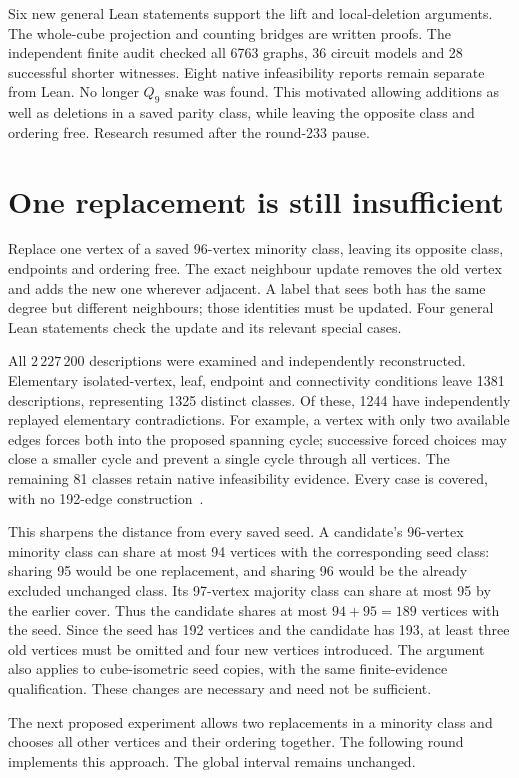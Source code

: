 \documentclass[11pt,a4paper]{article}
\begin{document}
Six new general Lean statements support the lift and local-deletion
arguments. The whole-cube projection and counting bridges are written
proofs. The independent finite audit checked all 6763 graphs, 36 circuit
models and 28 successful shorter witnesses. Eight native infeasibility
reports remain separate from Lean. No longer $Q_9$ snake was found.
This motivated allowing additions as well as deletions in a saved parity
class, while leaving the opposite class and ordering free. Research
resumed after the round-233 pause.

\section{One replacement is still insufficient}
Replace one vertex of a saved 96-vertex minority class, leaving its
opposite class, endpoints and ordering free. The exact neighbour update
removes the old vertex and adds the new one wherever adjacent. A label
that sees both has the same degree but different neighbours; those
identities must be updated. Four general Lean statements check the
update and its relevant special cases.

All $2\,227\,200$ descriptions were examined and independently
reconstructed. Elementary isolated-vertex, leaf, endpoint and connectivity
conditions leave 1381 descriptions, representing 1325 distinct classes.
Of these, 1244 have independently replayed elementary contradictions.
For example, a vertex with only two available edges forces both into
the proposed spanning cycle; successive forced choices may close a
smaller cycle and prevent a single cycle through all vertices. The
remaining 81 classes retain native infeasibility evidence. Every case
is covered, with no 192-edge construction~\cite{research234}.

This sharpens the distance from every saved seed. A candidate's
96-vertex minority class can share at most 94 vertices with the
corresponding seed class: sharing 95 would be one replacement, and
sharing 96 would be the already excluded unchanged class. Its
97-vertex majority class can share at most 95 by the earlier cover.
Thus the candidate shares at most $94+95=189$ vertices with the seed.
Since the seed has 192 vertices and the candidate has 193, at least
three old vertices must be omitted and four new vertices introduced.
The argument also applies to cube-isometric seed copies, with the same
finite-evidence qualification. These changes are necessary and need
not be sufficient.

The next proposed experiment allows two replacements in a minority
class and chooses all other vertices and their ordering together.
The following round implements this approach. The global interval
remains unchanged.
\end{document}
